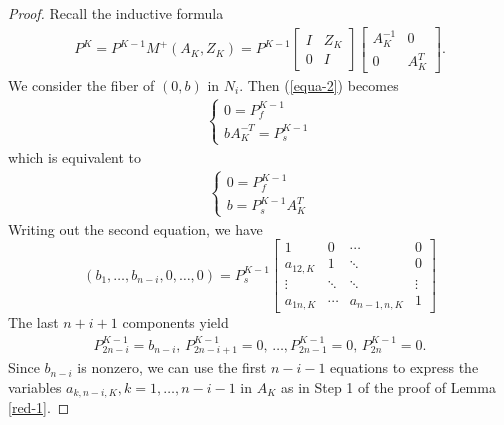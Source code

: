 \documentclass[10pt,a4paper]{amsart}
\begin{document}
\begin{proof}%
Recall the inductive formula
\begin{align*}
    P^K = P^{K-1} M^+(A_K,Z_K) = P^{K-1} \left[\begin{array}{ccc} I & Z_K \\ 0 & I\end{array}\right] \left[\begin{array}{ccc} A^{-1}_K & 0 \\ 0 & A^T_K\end{array}\right].
\end{align*}
We consider the fiber of $(0,b)$ in $N_i$. Then (\ref{equa-2}) becomes
\begin{align*}
    \begin{cases}
    0 = P^{K-1}_{f} \\
    b A^{-T}_K = P^{K-1}_s  
    \end{cases}
\end{align*}
which is equivalent to
\begin{align} \label{P_f=0}
    \begin{cases}
    0 = P^{K-1}_{f}  \\
    b  = P^{K-1}_s  A^{T}_K
    \end{cases}
\end{align}
Writing out the second equation, we have
\[
    ( b_1, \dots, b_{n-i}, 0, \dots, 0) = P^{K-1}_s 
    \begin{bmatrix}
     1 & 0 & \cdots &0 \\  a_{12,K} & 1 & \ddots & 0 \\
    \vdots & \ddots & \ddots & \vdots \\
    a_{1n,K} & \cdots & a_{n-1,n,K} & 1
    \end{bmatrix}
\]
The last $n+i+1$ components yield
\begin{align} \label{n+i+1}
    P^{K-1}_{2n-i}=b_{n-i}, \, P^{K-1}_{2n-i+1}=0, \, \dots, P^{K-1}_{2n-1} = 0, \, P^{K-1}_{2n} = 0.
\end{align}
Since $b_{n-i}$ is nonzero, we can use the first $n-i-1$ equations to express the variables $a_{k,n-i,K}, k = 1, \dots, n-i-1$ in $A_K$ as in Step 1 of the proof of Lemma \ref{red-1}.


\end{proof}
\end{document}
